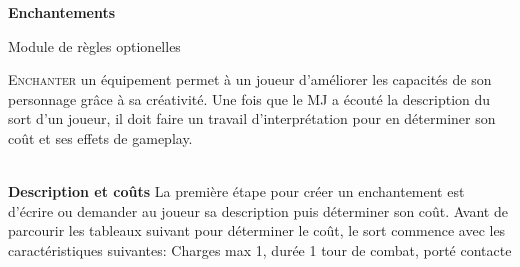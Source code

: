 \documentclass[11pt]{article} %
\newcommand{\enluminure}[2]{\lettrine[lines=3]{\small \initfamily #1}{#2}}
\newcommand{\myjump}[1][1]{\mbox{}\\[#1cm]}
\begin{document}
\pagestyle{empty}

\begin{center}
    \textbf{Enchantements}

    Module de règles optionelles
\end{center}



\enluminure{E}{nchanter} un équipement permet à un joueur d'améliorer les capacités de son personnage grâce à sa créativité. Une fois que le MJ a écouté la description du sort d'un joueur, il doit faire un travail d'interprétation pour en déterminer son coût et ses effets de gameplay.




\myjump[0]
\textbf{\huge Description et coûts}\newline
La première étape pour créer un enchantement est d'écrire ou demander au joueur sa description puis déterminer son coût. Avant de parcourir les tableaux suivant pour déterminer le coût, le sort commence avec les caractéristiques suivantes:
Charges max 1, durée 1 tour de combat, porté contacte
\end{document}

